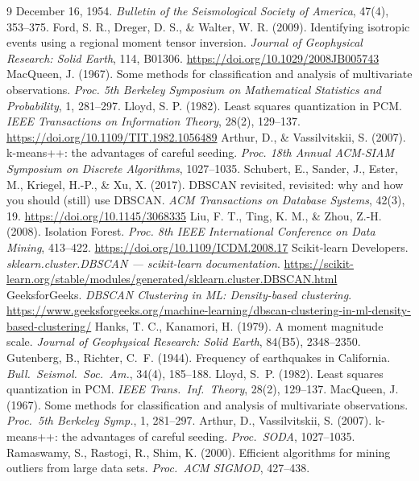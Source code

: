 \documentclass[a4paper,11pt]{article}
\begin{document}
\begin{thebibliography}{9}
December 16, 1954. \textit{Bulletin of the Seismological Society of America}, 47(4), 353--375.
 Ford, S. R., Dreger, D. S., \& Walter, W. R. (2009). Identifying isotropic events using a regional moment
tensor inversion. \textit{Journal of Geophysical Research: Solid Earth}, 114, B01306. \url{https://doi.org/10.1029/2008JB005743}
 MacQueen, J. (1967). Some methods for classification and analysis of multivariate observations.
\textit{Proc. 5th Berkeley Symposium on Mathematical Statistics and Probability}, 1, 281--297.
 Lloyd, S. P. (1982). Least squares quantization in PCM. \textit{IEEE Transactions on Information Theory},
28(2), 129--137. \url{https://doi.org/10.1109/TIT.1982.1056489}
 Arthur, D., \& Vassilvitskii, S. (2007). k-means++: the advantages of careful seeding. \textit{Proc. 18th
Annual ACM-SIAM Symposium on Discrete Algorithms}, 1027--1035.
 Schubert, E., Sander, J., Ester, M., Kriegel, H.-P., \& Xu, X. (2017). DBSCAN revisited, revisited: why
and how you should (still) use DBSCAN. \textit{ACM Transactions on Database Systems}, 42(3), 19. \url{https://doi.org/10.1145/3068335}
 Liu, F. T., Ting, K. M., \& Zhou, Z.-H. (2008). Isolation Forest. \textit{Proc. 8th IEEE International
Conference on Data Mining}, 413--422. \url{https://doi.org/10.1109/ICDM.2008.17}
 Scikit-learn Developers. \textit{sklearn.cluster.DBSCAN --- scikit-learn documentation}. \url{https://scikit-learn.org/stable/modules/generated/sklearn.cluster.DBSCAN.html}
 GeeksforGeeks. \textit{DBSCAN Clustering in ML: Density-based clustering}. \url{https://www.geeksforgeeks.org/machine-learning/dbscan-clustering-in-ml-density-based-clustering/}
 Hanks, T. C., Kanamori, H. (1979). A moment magnitude scale. \emph{Journal of Geophysical Research: Solid Earth}, 84(B5), 2348--2350.
 Gutenberg, B., Richter, C.\ F. (1944). Frequency of earthquakes in California. \emph{Bull.\ Seismol.\ Soc.\ Am.}, 34(4), 185--188.
 Lloyd, S.\ P. (1982). Least squares quantization in PCM. \emph{IEEE Trans.\ Inf.\ Theory}, 28(2), 129--137.
 MacQueen, J. (1967). Some methods for classification and analysis of multivariate observations. \emph{Proc.\ 5th Berkeley Symp.}, 1, 281--297.
 Arthur, D., Vassilvitskii, S. (2007). k-means++: the advantages of careful seeding. \emph{Proc.\ SODA}, 1027--1035.
 Ramaswamy, S., Rastogi, R., Shim, K. (2000). Efficient algorithms for mining outliers from large data sets. \emph{Proc.\ ACM SIGMOD}, 427--438.

\end{thebibliography}
\end{document}
